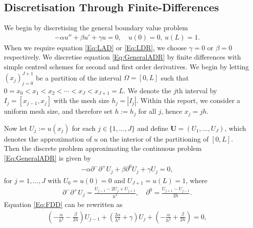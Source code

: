 \documentclass[a4paper,11pt]{article}
\theoremstyle{break}
\theoremstyle{break2}
\theoremstyle{break}
\theoremstyle{break2}
\begin{document}
\subsection{Discretisation Through Finite-Differences}
We begin by discretising the general boundary value problem
\begin{align}\label{Eq:GeneralADR}
-\alpha u'' + \beta u' + \gamma u = 0, \quad u(0) = 0,\ u(L) = 1.
\end{align}
When we require equation \eqref{Eq:LAD} or \eqref{Eq:LDR}, we choose $ \gamma = 0 $ or $ \beta = 0 $ respectively. We discretise equation \eqref{Eq:GeneralADR} by finite differences with simple centred schemes for second and first order derivatives. We begin by letting $ (x_j)_{j=0}^{J+1} $ be a partition of the interval $ \Omega = [0,L] $ such that $ 0 = x_0 < x_1 < x_2 < \cdots < x_J < x_{J+1} = L $. We denote the $ j $th interval by $ I_j = [x_{j-1},x_j] $ with the mesh size $ h_j = |I_j| $. Within this report, we consider a uniform mesh size, and therefore set $ h := h_j $ for all $ j $, hence $ x_j = jh $.
\begin{figure}[h]
	\centering
\end{figure}
Now let $ U_j := u(x_j) $ for each $ j \in \{1,\ldots,J\} $ and define $ \mathbf{U} = (U_1,\ldots,U_J) $, which denotes the approximation of $ u $ on the interior of the partitioning of $ [0,L] $. Then the discrete problem approximating the continuous problem \eqref{Eq:GeneralADR} is given by 
\begin{align}\label{Eq:FDD}
-\alpha\partial^-\partial^+ U_j + \beta \partial^0U_j + \gamma U_j = 0, 
\end{align}
for $ j = 1,\ldots,J $ with $ U_0 = u(0) = 0 $ and $ U_{J+1} = u(L) = 1 $, where
\begin{align*}
\partial^-\partial^+U_j = \frac{U_{j-1} - 2U_j + U_{j+1}}{h^2},\quad \partial^0 = \frac{U_{j+1} - U_{j-1}}{2h}.
\end{align*}
Equation \eqref{Eq:FDD} can be rewritten as
\begin{align*}
\left(-\frac{\alpha}{h^2} - \frac{\beta}{2h}\right)U_{j-1} + \left(\frac{2\alpha}{h^2} + \gamma\right)U_j + \left(-\frac{\alpha}{h^2} + \frac{\beta}{2h}\right) = 0,
\end{align*}
\end{document}
